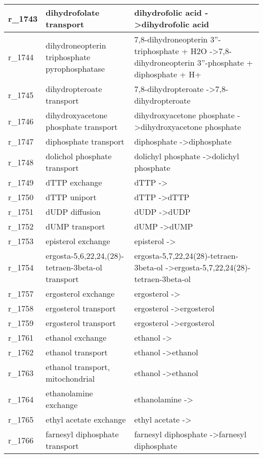\begin{landscape}
{\begin{longtable}{|l|p{7cm}|p{15cm}|}
r\_1743 & dihydrofolate transport & dihydrofolic acid  -\textgreater dihydrofolic acid \\ \hline
r\_1744 & dihydroneopterin triphosphate pyrophosphatase & 7,8-dihydroneopterin 3''-triphosphate + H2O  -\textgreater 7,8-dihydroneopterin 3''-phosphate + diphosphate + H+ \\ \hline
r\_1745 & dihydropteroate transport & 7,8-dihydropteroate  -\textgreater 7,8-dihydropteroate \\ \hline
r\_1746 & dihydroxyacetone phosphate transport & dihydroxyacetone phosphate  -\textgreater dihydroxyacetone phosphate \\ \hline
r\_1747 & diphosphate transport & diphosphate  -\textgreater diphosphate \\ \hline
r\_1748 & dolichol phosphate transport & dolichyl phosphate  -\textgreater dolichyl phosphate \\ \hline
r\_1749 & dTTP exchange & dTTP  -\textgreater{} \\ \hline
r\_1750 & dTTP uniport & dTTP  -\textgreater dTTP \\ \hline
r\_1751 & dUDP diffusion & dUDP  -\textgreater dUDP \\ \hline
r\_1752 & dUMP transport & dUMP  -\textgreater dUMP \\ \hline
r\_1753 & episterol exchange & episterol  -\textgreater{} \\ \hline
r\_1754 & ergosta-5,6,22,24,(28)-tetraen-3beta-ol transport & ergosta-5,7,22,24(28)-tetraen-3beta-ol  -\textgreater ergosta-5,7,22,24(28)-tetraen-3beta-ol \\ \hline
r\_1757 & ergosterol exchange & ergosterol  -\textgreater{} \\ \hline
r\_1758 & ergosterol transport & ergosterol  -\textgreater ergosterol \\ \hline
r\_1759 & ergosterol transport & ergosterol  -\textgreater ergosterol \\ \hline
r\_1761 & ethanol exchange & ethanol  -\textgreater{} \\ \hline
r\_1762 & ethanol transport & ethanol  -\textgreater ethanol \\ \hline
r\_1763 & ethanol transport, mitochondrial & ethanol  -\textgreater ethanol \\ \hline
r\_1764 & ethanolamine exchange & ethanolamine  -\textgreater{} \\ \hline
r\_1765 & ethyl acetate exchange & ethyl acetate  -\textgreater{} \\ \hline
r\_1766 & farnesyl diphosphate transport & farnesyl diphosphate  -\textgreater farnesyl diphosphate \\ \hline

\end{longtable}}
\end{landscape}
